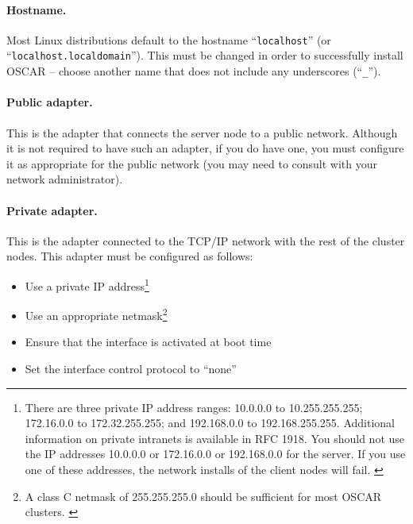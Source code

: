 \paragraph{Hostname.} Most Linux distributions default to the hostname
``{\tt localhost}'' (or ``{\tt localhost.localdomain}'').  This must
be changed in order to successfully install OSCAR -- choose another
name that does not include any underscores (``{\tt \_}'').

\paragraph{Public adapter.}  This is the adapter that connects the
server node to a public network.  Although it is not required to have
such an adapter, if you do have one, you must configure it as
appropriate for the public network (you may need to consult with your
network administrator).

\paragraph{Private adapter.}  This is the adapter connected to
the TCP/IP network with the rest of the cluster nodes.  This adapter
must be configured as follows:

\begin{itemize}
\item Use a private IP address\footnote{There are three private IP
    address ranges: 10.0.0.0 to 10.255.255.255; 172.16.0.0 to
    172.32.255.255; and 192.168.0.0 to 192.168.255.255.  Additional
    information on private intranets is available in RFC 1918.  You
    should not use the IP addresses 10.0.0.0 or 172.16.0.0 or
    192.168.0.0 for the server.  If you use one of these addresses,
    the network installs of the client nodes will fail.
    \label{foot:private-ip-ranges}}

\item Use an appropriate netmask\footnote{A class C netmask of
    255.255.255.0 should be sufficient for most OSCAR clusters.
    \label{foot:netmask}} 

\item Ensure that the interface is activated at boot time

\item Set the interface control protocol to ``none''

\end{itemize}

\endchange

